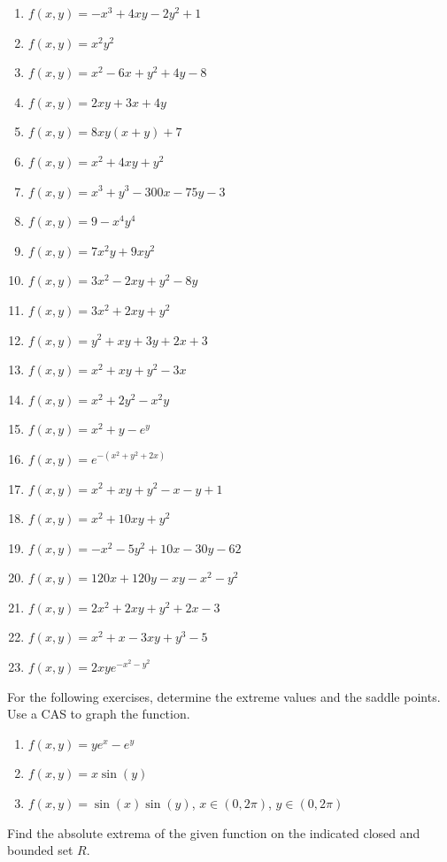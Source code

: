 \documentclass{exercises}
\begin{document}
\begin{enumerate}[resume]
\item $f(x,y)=-x^{3}+4xy-2y^{2}+1$
\item $f(x,y)=x^{2}y^{2}$
\item $f(x,y)=x^{2}-6x+y^{2}+4y-8$
\item $f(x,y)=2xy+3x+4y$
\item $f(x,y)=8xy(x+y)+7$
\item $f(x,y)=x^{2}+4xy+y^{2}$
\item $f(x,y)=x^{3}+y^{3}-300x-75y-3$
\item $f(x,y)=9-x^{4}y^{4}$
\item $f(x,y)=7x^{2}y+9xy^{2}$
\item $f(x,y)=3x^{2}-2xy+y^{2}-8y$
\item $f(x,y)=3x^{2}+2xy+y^{2}$
\item $f(x,y)=y^{2}+xy+3y+2x+3$
\item $f(x,y)=x^{2}+xy+y^{2}-3x$
\item $f(x,y)=x^{2}+2y^{2}-x^{2}y$
\item $f(x,y)=x^{2}+y-e^{y}$
\item $f(x,y)=e^{-(x^{2}+y^{2}+2x)}$
\item $f(x,y)=x^{2}+xy+y^{2}-x-y+1$
\item $f(x,y)=x^{2}+10xy+y^{2}$
\item $f(x,y)=-x^{2}-5y^{2}+10x-30y-62$
\item $f(x,y)=120x+120y-xy-x^{2}-y^{2}$
\item $f(x,y)=2x^{2}+2xy+y^{2}+2x-3$
\item $f(x,y)=x^{2}+x-3xy+y^{3}-5$
\item $f(x,y)=2xye^{-x^{2}-y^{2}}$
\end{enumerate}

For the following exercises, determine the extreme values and the saddle points. Use a CAS to graph the function.

\begin{enumerate}[resume]
\item \techrequired $f(x,y)=ye^{x}-e^{y}$
\item \techrequired $f(x,y)=x\sin(y)$
\item \techrequired $f(x,y)=\sin(x)\sin(y)$, $x\in(0,2\pi)$, $y\in(0,2\pi)$
\end{enumerate}

Find the absolute extrema of the given function on the indicated closed and bounded set $R$.
\end{document}

